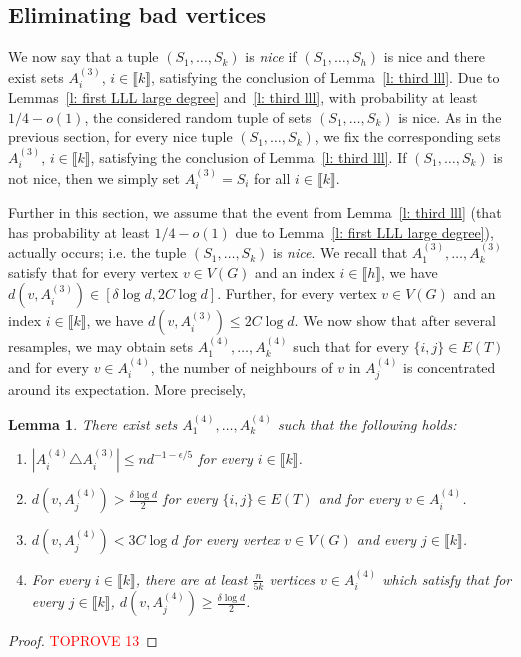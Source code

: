 \documentclass[notitlepage]{scrartcl}
\newcommand{\br}[1]{\llbracket{#1}\rrbracket}
\newtheorem{lemma}[thm]{Lemma}
\begin{document}
\subsection{Eliminating bad vertices}\label{s: bad vertices}

We now say that a tuple $(S_1,\ldots,S_k)$ is \emph{nice} if $(S_1,\ldots,S_h)$ is nice and there exist sets $A_i^{(3)}$, $i\in \br{k}$, satisfying the conclusion of Lemma~\ref{l: third lll}. Due to Lemmas~\ref{l: first LLL large degree} and~\ref{l: third lll}, with probability at least $1/4-o(1)$, the considered random tuple of sets $(S_1,\ldots,S_k)$ is nice. As in the previous section, for every nice tuple $(S_1,\ldots,S_k)$, we fix the corresponding sets $A_i^{(3)}$, $i\in \br{k}$, satisfying the conclusion of Lemma~\ref{l: third lll}. If $(S_1,\ldots,S_k)$ is not nice, then we simply set $A_i^{(3)}=S_i$ for all $i\in \br{k}$.


Further in this section, we assume that the event from Lemma~\ref{l: third lll} (that has probability at least $1/4-o(1)$ due to Lemma~\ref{l: first LLL large degree}), actually occurs; i.e. the tuple $(S_1,\ldots,S_k)$ is \emph{nice}. We recall that $A_1^{(3)},\ldots, A_k^{(3)}$ satisfy that for every vertex $v \in V(G)$ and an index $i \in \br{h}$, we have $d(v, A_i^{(3)}) \in [\delta \log d, 2C \log d]$. Further, for every vertex $v \in V(G)$ and an index $i\in \br{k}$, we have $d(v, A_i^{(3)}) \le 2C \log d$. We now show that after several resamples, we may obtain sets $A_1^{(4)}, \ldots, A_k^{(4)}$ such that for every $\{i, j\} \in E(T)$ and for every $v \in A_i^{(4)}$, the number of neighbours of $v$ in $A_j^{(4)}$ is concentrated around its expectation. More precisely, 
\begin{lemma}\label{l: no b}
There exist sets $A_1^{(4)}, \dots, A_k^{(4)}$ such that the following holds:
    \begin{enumerate}
        \item $\left|A_i^{(4)}\triangle A_i^{(3)}\right|\le nd^{-1-\epsilon/5}$ for every $i\in \br{k}$.\label{l: no b item}
        \item $d(v, A_j^{(4)}) > \frac{\delta \log d}{2}$ for every $\{i,j\} \in E(T)$ and for every $v \in A_i^{(4)}$.
        \item $d(v, A_j^{(4)}) < 3C \log d$ for every vertex $v \in V(G)$ and every $j \in \br{k}$.
        \item For every $i\in \br{k}$, there are at least $\frac{n}{5k}$ vertices $v\in A_i^{(4)}$ which satisfy that for every $j\in \br{k}$, $d(v,A_j^{(4)})\ge \frac{\delta\log d}{2}$. 
    \end{enumerate}
\end{lemma}
\begin{proof}\textcolor{red}{TOPROVE 13}\end{proof}
\end{document}
